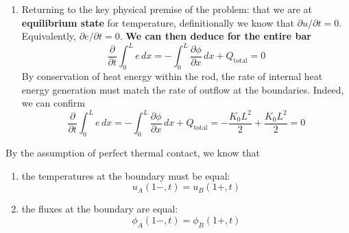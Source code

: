 \documentclass[a4paper]{article}
\begin{document}
\begin{enumerate}[label=(\alph*)]
	Now, taking a step back, consider the flux component of the heat equation, which gives us the combined heat energy outflow per unit time at \textit{both} boundaries.
	\[
		-\int^{L}_{0} \frac{\partial \phi}{\partial x} \, dx = K_{0}\frac{\partial u}{\partial x}\!\left( L,t \right) - K_{0}\frac{\partial u}{\partial x}\!\left( 0,t \right) = -\frac{K_{0}L^{2}}{2}
	\]
	\item Returning to the key physical premise of the problem: that we are at \textbf{equilibrium state} for temperature, definitionally we know that \( \partial u / \partial t = 0 \). Equivalently, \( \partial e / \partial t = 0 \). \textbf{We can then deduce for the entire bar}
	\[
		\frac{\partial }{\partial t}\int^{L}_{0} e \, dx = -\int^{L}_{0} \frac{\partial \phi}{\partial x} \, dx + Q_{\text{total}} = 0
	\]
	By conservation of heat energy within the rod, the rate of internal heat energy generation must match the rate of outflow at the boundaries. Indeed, we can confirm
	\[
		\frac{\partial }{\partial t}\int^{L}_{0} e \, dx = -\int^{L}_{0} \frac{\partial \phi}{\partial x} \, dx + Q_{\text{total}} = -\frac{K_{0}L^{2}}{2} + \frac{K_{0}L^{2}}{2} = 0
	\]
\end{enumerate}


By the assumption of perfect thermal contact, we know that 

\begin{enumerate}[label=(\alph*)]
	\item the temperatures at the boundary must be equal:
	\[
		u_{A}\!\left( 1-,t \right) = u_{B}\!\left( 1+,t \right) 
	\]
	\item the fluxes at the boundary are equal: 
	\[ 
		\phi_{A}\!\left( 1-,t \right) = \phi_{B}\!\left( 1+,t \right) 
	\]
\end{enumerate}
\end{document}
